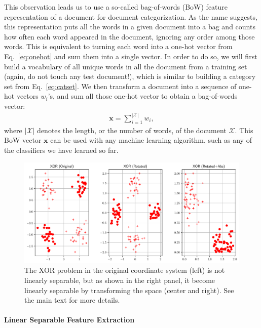 \documentclass{report}
\newcommand{\vect}[1]{\mathbf{#1}}
\newcommand{\vx}[0]{\vect{x}}
\begin{document}
This observation leads us to use a so-called bag-of-words (BoW) feature
representation of a document for document categorization. As the name suggests,
this representation puts all the words in a given document into a bag and counts
how often each word appeared in the document, ignoring any order among those
words. This is equivalent to turning each word into a one-hot vector from
Eq.~\eqref{eq:onehot} and sum them into a single vector. In order to do so, we
will first build a vocabulary of all unique words in all the document from a
training set (again, do not touch any test document!), which is similar to
building a category set from Eq.~\eqref{eq:catset}. We then transform a document
into a sequence of one-hot vectors $w_i$'s, and sum all those one-hot vector to
obtain a bag-of-words vector:
\begin{align*}
    \vx = \sum_{i=1}^{|\mathcal{X}|} w_i,
\end{align*}
where $|\mathcal{X}|$ denotes the length, or the number of words, of the
document $\mathcal{X}$. This BoW vector $\vx$ can be used with any machine
learning algorithm, such as any of the classifiers we have learned so far.

\begin{figure}
    \centering
    \includegraphics[width=\columnwidth]{figures/xor_transform.pdf}

    \caption{
        \label{fig:xor_transformed}
        The XOR problem in the original coordinate system (left) is not linearly
        separable, but as shown in the right panel, it become linearly
        separable by transforming the space (center and right). See the main
        text for more details.
    }
\end{figure}

\paragraph{Linear Separable Feature Extraction}
\end{document}
